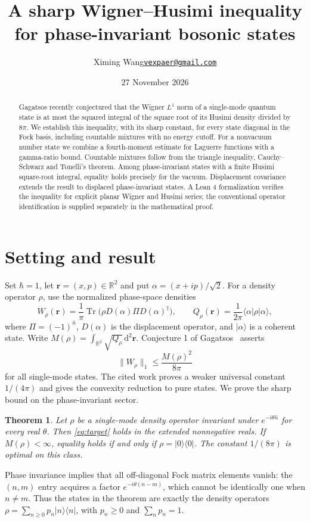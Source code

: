 \documentclass[11pt]{article}
\title{A sharp Wigner--Husimi inequality for phase-invariant bosonic states}
\author{Ximing Wang\quad\texttt{\href{mailto:vexpaer@gmail.com}{vexpaer@gmail.com}}}
\date{27 November 2026}
\newtheorem{theorem}{Theorem}
\newcommand{\R}{\mathbb R}
\newcommand{\dd}{\,\mathrm d}
\newcommand{\ket}[1]{\lvert #1\rangle}
\newcommand{\bra}[1]{\langle #1\rvert}
\newcommand{\norm}[1]{\lVert #1\rVert}
\begin{document}
\maketitle
\begin{abstract}
Gagatsos recently conjectured that the Wigner $L^1$ norm of a single-mode quantum state is at most the squared integral of the square root of its Husimi density divided by $8\pi$. We establish this inequality, with its sharp constant, for every state diagonal in the Fock basis, including countable mixtures with no energy cutoff. For a nonvacuum number state we combine a fourth-moment estimate for Laguerre functions with a gamma-ratio bound. Countable mixtures follow from the triangle inequality, Cauchy--Schwarz and Tonelli's theorem. Among phase-invariant states with a finite Husimi square-root integral, equality holds precisely for the vacuum. Displacement covariance extends the result to displaced phase-invariant states. A Lean 4 formalization verifies the inequality for explicit planar Wigner and Husimi series; the conventional operator identification is supplied separately in the mathematical proof.
\end{abstract}

\section{Setting and result}
Set $\hbar=1$, let $\mathbf r=(x,p)\in\R^2$ and put $\alpha=(x+ip)/\sqrt2$. For a density operator $\rho$, use the normalized phase-space densities
\begin{equation}
 W_\rho(\mathbf r)=\frac{1}{\pi}\operatorname{Tr}\bigl(\rho D(\alpha)\Pi D(\alpha)^\dagger\bigr),\qquad
 Q_\rho(\mathbf r)=\frac{1}{2\pi}\bra{\alpha}\rho\ket{\alpha},
\end{equation}
where $\Pi=(-1)^{\hat n}$, $D(\alpha)$ is the displacement operator, and $\ket{\alpha}$ is a coherent state. Write $M(\rho)=\int_{\R^2}\sqrt{Q_\rho}\dd^2\mathbf r$. Conjecture 1 of Gagatsos~\cite{gagatsos} asserts
\begin{equation}\label{eq:target}
 \norm{W_\rho}_1\leq \frac{M(\rho)^2}{8\pi}
\end{equation}
for all single-mode states. The cited work proves a weaker universal constant $1/(4\pi)$ and gives the convexity reduction to pure states. We prove the sharp bound on the phase-invariant sector.

\begin{theorem}\label{thm:main}
Let $\rho$ be a single-mode density operator invariant under $e^{-i\theta\hat n}$ for every real $\theta$. Then \eqref{eq:target} holds in the extended nonnegative reals. If $M(\rho)<\infty$, equality holds if and only if $\rho=\ket{0}\bra{0}$. The constant $1/(8\pi)$ is optimal on this class.
\end{theorem}
Phase invariance implies that all off-diagonal Fock matrix elements vanish: the $(n,m)$ entry acquires a factor $e^{-i\theta(n-m)}$, which cannot be identically one when $n\ne m$. Thus the states in the theorem are exactly the density operators $\rho=\sum_{n\geq0}p_n\ket n\bra n$, with $p_n\geq0$ and $\sum_n p_n=1$.
\end{document}
